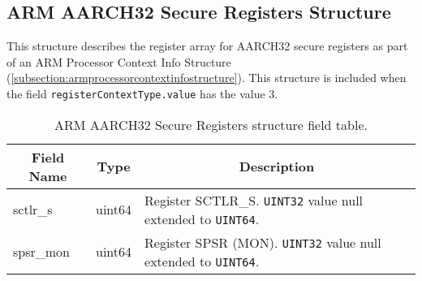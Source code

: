 \documentclass{report}
\newcommand*{\thead}[1]{\multicolumn{1}{|c|}{\bfseries #1}}
\newcommand*{\jsontable}[1]{
    \begin{table}[!ht]
    \label{#1}
    \centering
    \begin{adjustbox}{center}
    \begin{tabular}{|l|c|p{8cm}|}
    \hline
    \thead{Field Name} & \thead{Type} & \thead{Description} \\
    \hline
}
\newcommand*{\jsontableend}[1]{
    \hline
    \end{tabular}
    \end{adjustbox}
    \caption{#1}
    \label{table:#1}
    \end{table}
    \FloatBarrier
}
\begin{document}
\subsection{ARM AARCH32 Secure Registers Structure}
\label{subsection:armaarch32secureregistersstructure}
This structure describes the register array for AARCH32 secure registers as part of an ARM Processor Context Info Structure (\ref{subsection:armprocessorcontextinfostructure}). This structure is included when the field \texttt{registerContextType.value} has the value 3.
\jsontable{table:armaarch32secureregistersstructure}
sctlr\_s & uint64 & Register SCTLR\_S. \texttt{UINT32} value null extended to \texttt{UINT64}.\\
\hline
spsr\_mon & uint64 & Register SPSR (MON). \texttt{UINT32} value null extended to \texttt{UINT64}.\\
\jsontableend{ARM AARCH32 Secure Registers structure field table.}

\end{document}
